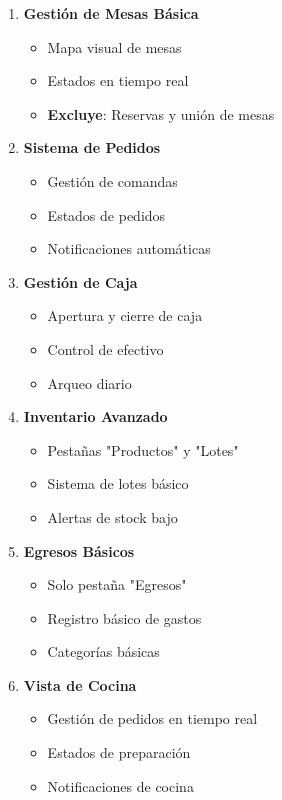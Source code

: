 \documentclass[12pt,a4paper]{article}
\begin{document}
\begin{enumerate}
    \item \textbf{Gestión de Mesas Básica}
    \begin{itemize}
        \item Mapa visual de mesas
        \item Estados en tiempo real
        \item \textbf{Excluye}: Reservas y unión de mesas
    \end{itemize}
    
    \item \textbf{Sistema de Pedidos}
    \begin{itemize}
        \item Gestión de comandas
        \item Estados de pedidos
        \item Notificaciones automáticas
    \end{itemize}
    
    \item \textbf{Gestión de Caja}
    \begin{itemize}
        \item Apertura y cierre de caja
        \item Control de efectivo
        \item Arqueo diario
    \end{itemize}
    
    \item \textbf{Inventario Avanzado}
    \begin{itemize}
        \item Pestañas "Productos" y "Lotes"
        \item Sistema de lotes básico
        \item Alertas de stock bajo
    \end{itemize}
    
    \item \textbf{Egresos Básicos}
    \begin{itemize}
        \item Solo pestaña "Egresos"
        \item Registro básico de gastos
        \item Categorías básicas
    \end{itemize}
    
    \item \textbf{Vista de Cocina}
    \begin{itemize}
        \item Gestión de pedidos en tiempo real
        \item Estados de preparación
        \item Notificaciones de cocina
    \end{itemize}
\end{enumerate}
\end{document}
